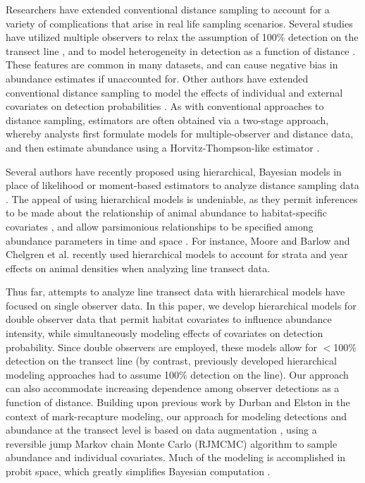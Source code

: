 \documentclass[10pt]{article}
\begin{document}
Researchers have extended conventional distance sampling to account for a variety of complications that arise in real life sampling scenarios.  Several studies have utilized multiple observers to relax the assumption of 100\% detection on the transect line \cite{BorchersEtAl1998}, and to model heterogeneity in detection as a function of distance \cite{LaakeBorchers2004,BorchersEtAl2006,BucklandEtAl2010}.  These features are common in many datasets, and can cause negative bias in abundance estimates if unaccounted for.  Other authors have extended conventional distance sampling to model the effects of individual and external covariates on detection probabilities \cite{DrummerMcdonald1987,RamseyEtAl1987,MarquesBuckland2003}.  As with conventional approaches to distance sampling, estimators are often obtained via a two-stage approach, whereby analysts first formulate models for multiple-observer and distance data, and then estimate abundance using a Horvitz-Thompson-like estimator \cite{Huggins1989,Alho1990}.

Several authors have recently proposed using hierarchical, Bayesian models in place of likelihood or moment-based estimators to analyze distance sampling data \cite{RoyleDorazio2008,LinkBarker2010,RoyleDorazio2010,MooreBarlow2011,ChelgrenEtAl2011,SchmidtEtAl2012}. The appeal of using hierarchical models is undeniable, as they permit inferences to be made about the relationship of animal abundance to habitat-specific covariates \cite{RoyleEtAl2004}, and allow parsimonious relationships to be specified among abundance parameters in time and space \cite{RoyleEtAl2007}.
For instance, Moore and Barlow \cite{MooreBarlow2011} and Chelgren et al. \cite{ChelgrenEtAl2011} recently used hierarchical models to account for strata and year effects on animal densities when analyzing line transect data.

Thus far, attempts to analyze line transect data with hierarchical models have focused on single observer data.  In this paper, we develop hierarchical models for double observer data that permit habitat covariates to influence abundance intensity, while simultaneously modeling effects of covariates on detection probability.  Since double observers are employed, these models allow for $<$100\% detection on the transect line (by contrast, previously developed hierarchical modeling approaches had to assume 100\% detection on the line).  Our approach can also accommodate increasing dependence among observer detections as a function of distance.  Building upon previous work by Durban and Elston \cite{DurbanElston2005} in the context of mark-recapture modeling, our approach for modeling detections and abundance at the transect level is based on data augmentation \cite{TannerWong1987,RoyleEtAl2007b}, using a reversible jump Markov chain Monte Carlo (RJMCMC) algorithm \cite{CarlinChib1995,Green1995} to sample abundance and individual covariates.  Much of the modeling is accomplished in probit space, which greatly simplifies Bayesian computation \cite{AlbertChib1993}.
\end{document}
